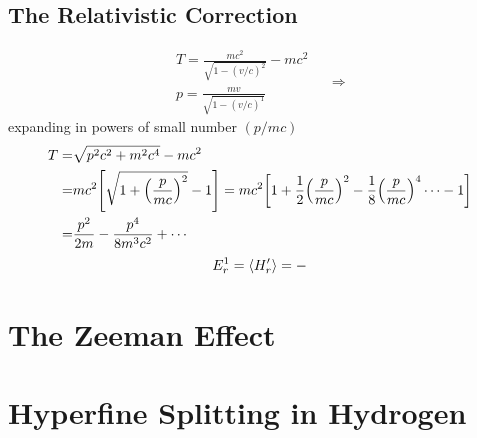 \subsection{The Relativistic Correction}
\[\begin{aligned}
    T=\frac{mc^2}{\sqrt{1-(v/c)^2}}-mc^2 \\
    p=\frac{mv}{\sqrt{1-(v/c)^1}}
\end{aligned}\quad\Rightarrow \]
expanding in powers of small number \((p/mc)\)
\[\begin{aligned}
    T=& \sqrt{p^2c^2+m^2c^4}-mc^2 \\
    =& mc^2\qty[\sqrt{1+\qty(\frac{p}{mc})^2}-1]=mc^2\qty[1+\frac{1}{2}\qty(\frac{p}{mc})^2-\frac{1}{8}\qty(\frac{p}{mc})^4\cdots -1]\\
    =& \frac{p^2}{2m}-\frac{p^4}{8m^3c^2}+\cdots
\end{aligned}\]
\[\begin{aligned}
    E_r^1 = \expval{H_r'}=-
\end{aligned}\]
\section{The Zeeman Effect}
\section{Hyperfine Splitting in Hydrogen}
